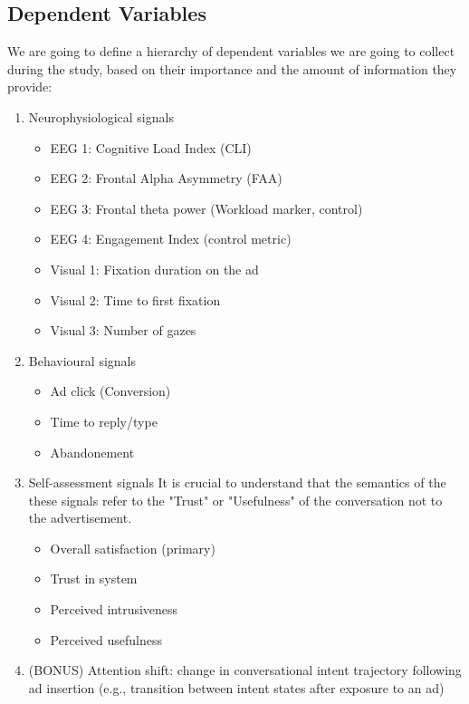 \documentclass{article}
\begin{document}
\subsection{Dependent Variables}

We are going to define a hierarchy of dependent variables we are going to collect during the study, based on their importance and the amount of information they provide:

\begin{enumerate}
    \item Neurophysiological signals 
        \begin{itemize}
            \item EEG 1: Cognitive Load Index (CLI)
            \item EEG 2: Frontal Alpha Asymmetry (FAA)
            \item EEG 3: Frontal theta power (Workload marker, control)
            \item EEG 4: Engagement Index (control metric) 
            \item Visual 1: Fixation duration on the ad
            \item Visual 2: Time to first fixation 
            \item Visual 3: Number of gazes 
        \end{itemize}
        
    \item Behavioural signals 
        \begin{itemize}
            \item Ad click (Conversion)
            \item Time to reply/type 
            \item Abandonement 
        \end{itemize}
        
    \item Self-assessment signals
        It is crucial to understand that the semantics of the these signals refer to the "Trust" or "Usefulness" of the conversation not to the advertisement.
        \begin{itemize}
            \item Overall satisfaction (primary)
            \item Trust in system
            \item Perceived intrusiveness
            \item Perceived usefulness
        \end{itemize}

    \item (BONUS) Attention shift: change in conversational intent trajectory following ad insertion (e.g., transition between intent states after exposure to an ad)
\end{enumerate}
\end{document}
